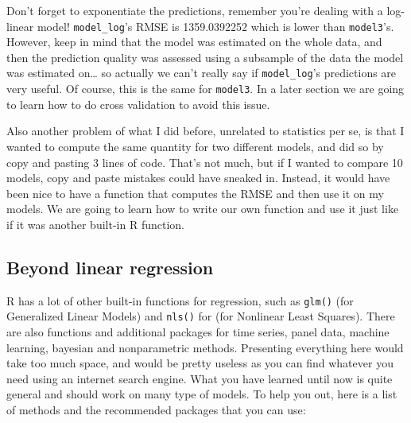 \documentclass[]{gitbook}
\theoremstyle{definition}
\theoremstyle{definition}
\theoremstyle{definition}
\theoremstyle{remark}
\begin{document}
Don't forget to exponentiate the predictions, remember you're dealing
with a log-linear model! \texttt{model\_log}'s RMSE is 1359.0392252
which is lower than \texttt{model3}'s. However, keep in mind that the
model was estimated on the whole data, and then the prediction quality
was assessed using a subsample of the data the model was estimated
on\ldots{} so actually we can't really say if \texttt{model\_log}'s
predictions are very useful. Of course, this is the same for
\texttt{model3}. In a later section we are going to learn how to do
cross validation to avoid this issue.

Also another problem of what I did before, unrelated to statistics per
se, is that I wanted to compute the same quantity for two different
models, and did so by copy and pasting 3 lines of code. That's not much,
but if I wanted to compare 10 models, copy and paste mistakes could have
sneaked in. Instead, it would have been nice to have a function that
computes the RMSE and then use it on my models. We are going to learn
how to write our own function and use it just like if it was another
built-in R function.

\hypertarget{beyond-linear-regression}{%
\subsection{Beyond linear regression}\label{beyond-linear-regression}}

R has a lot of other built-in functions for regression, such as
\texttt{glm()} (for Generalized Linear Models) and \texttt{nls()} for
(for Nonlinear Least Squares). There are also functions and additional
packages for time series, panel data, machine learning, bayesian and
nonparametric methods. Presenting everything here would take too much
space, and would be pretty useless as you can find whatever you need
using an internet search engine. What you have learned until now is
quite general and should work on many type of models. To help you out,
here is a list of methods and the recommended packages that you can use:
\end{document}
